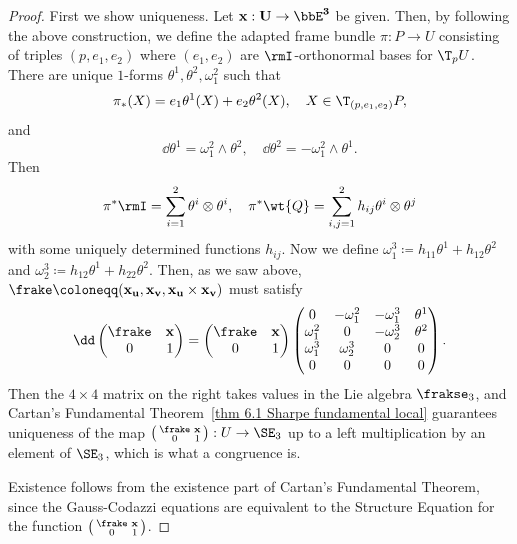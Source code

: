 \begin{proof}
    First we show uniqueness. Let $\bf{x}:U\to \bbE^3$ be given. Then, by following the above construction, we define the adapted frame bundle $\pi:P\to U$ consisting of triples $(p,e_1,e_2)$ where $(e_1,e_2)$ are $\rmI$-orthonormal bases for $\T_p U$. There are unique $1$-forms $\theta^1,\theta^2,\omega_1^2$ such that 
    \[\pi_\ast(X)=e_1\theta^1(X)+e_2\theta^2(X),\quad X\in \T_{(p,e_1,e_2)}P,\]
    and
    \[\dd\theta^1=\omega_1^2\wedge \theta^2,\quad \dd\theta^2=-\omega_1^2\wedge\theta^1.\]
    Then 
    \[\pi^\ast\rmI=\sum_{i=1}^2\theta^i\otimes\theta^i,\quad \pi^\ast \wt{Q}=\sum_{i,j=1}^2 h_{ij}\theta^i\otimes\theta^j\]
    with some uniquely determined functions $h_{ij}$. Now we define $\omega_1^3\coloneqq h_{11}\theta^1+h_{12}\theta^2$ and $\omega_2^3\coloneqq h_{12}\theta^1+h_{22}\theta^2$. Then, as we saw above, $\frake\coloneqq(\bf{x}_u,\bf{x}_v,\bf{x}_u\times \bf{x}_v)$ must satisfy 
    \[\dd \begin{pmatrix}
        \frake & \bf{x}\\
        0& 1
    \end{pmatrix}=\begin{pmatrix}
        \frake & \bf{x}\\
        0& 1
    \end{pmatrix}
    \begin{pmatrix}
        0 & -\omega_1^2 & -\omega_1^3& \theta^1\\
        \omega_1^2 & 0 & -\omega_2^3 & \theta^2\\
        \omega_1^3 & \omega_2^3 & 0 & 0\\
        0 & 0& 0& 0
    \end{pmatrix}.
    \]
    Then the $4\times 4$ matrix on the right takes values in the Lie algebra $\frakse_3$, and Cartan's Fundamental Theorem~\ref{thm 6.1 Sharpe fundamental local} guarantees uniqueness of the map $\left(\begin{smallmatrix}
        \frake & \bf{x}\\
        0& 1
    \end{smallmatrix}\right): U\to \SE_3$ up to a left multiplication by an element of $\SE_3$, which is what a congruence is.

    Existence follows from the existence part of Cartan's Fundamental Theorem, since the Gauss-Codazzi equations are equivalent to the Structure Equation for the function $\left(\begin{smallmatrix}
        \frake & \bf{x}\\
        0& 1
    \end{smallmatrix}\right)$.
\end{proof}

